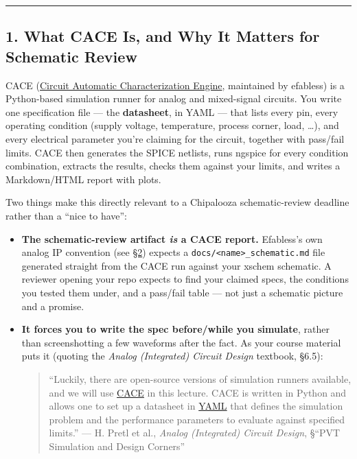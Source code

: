\documentclass[
]{article}
\begin{document}
\begin{center}\rule{0.5\linewidth}{0.5pt}\end{center}

\hypertarget{what-cace-is-and-why-it-matters-for-schematic-review}{%
\subsection{1. What CACE Is, and Why It Matters for Schematic
Review}\label{what-cace-is-and-why-it-matters-for-schematic-review}}

CACE (\href{https://github.com/efabless/cace}{Circuit Automatic
Characterization Engine}, maintained by efabless) is a Python-based
simulation runner for analog and mixed-signal circuits. You write one
specification file --- the \textbf{datasheet}, in YAML --- that lists
every pin, every operating condition (supply voltage, temperature,
process corner, load, \ldots), and every electrical parameter you're
claiming for the circuit, together with pass/fail limits. CACE then
generates the SPICE netlists, runs ngspice for every condition
combination, extracts the results, checks them against your limits, and
writes a Markdown/HTML report with plots.

Two things make this directly relevant to a Chipalooza schematic-review
deadline rather than a ``nice to have'':

\begin{itemize}
\item
  \textbf{The schematic-review artifact \emph{is} a CACE report.}
  Efabless's own analog IP convention (see
  \protect\hyperlink{2-cace-project-layout}{§2}) expects a
  \texttt{docs/\textless{}name\textgreater{}\_schematic.md} file
  generated straight from the CACE run against your xschem schematic. A
  reviewer opening your repo expects to find your claimed specs, the
  conditions you tested them under, and a pass/fail table --- not just a
  schematic picture and a promise.
\item
  \textbf{It forces you to write the spec before/while you simulate},
  rather than screenshotting a few waveforms after the fact. As your
  course material puts it (quoting the \emph{Analog (Integrated) Circuit
  Design} textbook, §6.5):

  \begin{quote}
  ``Luckily, there are open-source versions of simulation runners
  available, and we will use
  \href{https://github.com/efabless/cace}{CACE} in this lecture. CACE is
  written in Python and allows one to set up a datasheet in
  \href{https://yaml.org}{YAML} that defines the simulation problem and
  the performance parameters to evaluate against specified limits.'' ---
  H. Pretl et al., \emph{Analog (Integrated) Circuit Design}, §``PVT
  Simulation and Design Corners''
  \end{quote}
\end{itemize}
\end{document}
